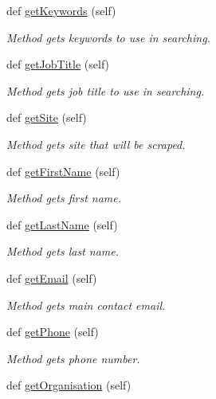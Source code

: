 \begin{DoxyCompactItemize}
def \hyperlink{classuserProfile_1_1userProfile_a1a61a204207c67cc6bc2c0b2b810ea32}{get\+Keywords} (self)
\begin{DoxyCompactList}\small\item\em Method gets keywords to use in searching. \end{DoxyCompactList}\item 
def \hyperlink{classuserProfile_1_1userProfile_a8cbc67cf93584ff8a9bd0d032c0a1c44}{get\+Job\+Title} (self)
\begin{DoxyCompactList}\small\item\em Method gets job title to use in searching. \end{DoxyCompactList}\item 
def \hyperlink{classuserProfile_1_1userProfile_afa86adbeac8ea685d8c9f1d343f734fd}{get\+Site} (self)
\begin{DoxyCompactList}\small\item\em Method gets site that will be scraped. \end{DoxyCompactList}\item 
def \hyperlink{classuserProfile_1_1userProfile_a3b66b43cf824415acf3c18dfb71ae226}{get\+First\+Name} (self)
\begin{DoxyCompactList}\small\item\em Method gets first name. \end{DoxyCompactList}\item 
def \hyperlink{classuserProfile_1_1userProfile_acb6d2593a392756816a448e09bdc1b24}{get\+Last\+Name} (self)
\begin{DoxyCompactList}\small\item\em Method gets last name. \end{DoxyCompactList}\item 
def \hyperlink{classuserProfile_1_1userProfile_a31aed4505464a0f546e0bb33306a355d}{get\+Email} (self)
\begin{DoxyCompactList}\small\item\em Method gets main contact email. \end{DoxyCompactList}\item 
def \hyperlink{classuserProfile_1_1userProfile_ac6014db8a44e3e1ea44d30a2dbeb2b25}{get\+Phone} (self)
\begin{DoxyCompactList}\small\item\em Method gets phone number. \end{DoxyCompactList}\item 
def \hyperlink{classuserProfile_1_1userProfile_aa146aa6eba2de13cfcff77e14409b891}{get\+Organisation} (self)

\end{DoxyCompactItemize}
